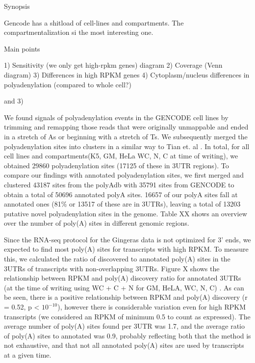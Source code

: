 \documentclass[a4paper]{article}
\begin{document}
 
Synopsis

Gencode has a shitload of cell-lines and compartments. The compartmentalization
si the most interesting one.

Main points

1) Sensitivity (we only get high-rpkm genes) diagram
2) Coverage (Venn diagram)
3) Differences in high RPKM genes
4) Cytoplasm/nucleus differences in polyadenylation (compared to whole cell?)

and 3) %

We found signals of polyadenylation events in the GENCODE cell lines by
trimming and remapping those reads that were originally unmappable and ended in
a stretch of As or beginning with a stretch of Ts. We subsequently merged the
polyadenylation sites into clusters in a similar way to Tian et. al
\cite{tian_large-scale_2005}. In total, for all cell lines and compartments(K5,
GM, HeLa WC, N, C at time of writing), we obtained 29860 polyadenylation sites
(17125 of these in 3UTR regions). To compare our findings with annotated
polyadenylation sites, we first merged and clustered 43187 sites from the
polyAdb with 35791 sites from GENCODE to obtain a total of 50696 annotated
polyA sites. 16657 of our polyA sites fall at annotated ones (81\% or 13517 of
these are in 3UTRs), leaving a total of 13203 putative novel polyadenylation
sites in the genome. Table XX shows an overview over the number of poly(A)
sites in different genomic regions.

Since the RNA-seq protocol for the Gingeras data is not optimized for 3' ends,
we expected to find most poly(A) sites for transcripts with high RPKM. To
measure this, we calculated the ratio of discovered to annotated poly(A) sites
in the 3UTRs of transcripts with non-overlapping 3UTRs. Figure X shows the
relationship between RPKM and poly(A) discovery ratio for annotated 3UTRs (at
the time of writing using WC + C + N for GM, HeLA, WC, N, C) . As can be seen,
there is a positive relationship between RPKM and poly(A) discovery (r = 0.52,
p < $10^{-10}$), however there is considerable variation even for high RPKM
transcripts (we considered an RPKM of minimum 0.5 to count as expressed). The
average number of poly(A) sites found per 3UTR was 1.7, and the average ratio
of poly(A) sites to annotated was 0.9, probably reflecting both that the method
is not exhaustive, and that not all annotated poly(A) sites are used by
transcripts at a given time.
\end{document}
